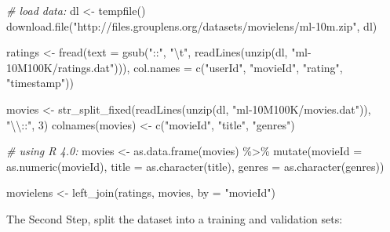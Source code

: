 \documentclass[
]{article}
\newenvironment{Shaded}{\begin{snugshade}}{\end{snugshade}}
\newcommand{\AttributeTok}[1]{\textcolor[rgb]{0.77,0.63,0.00}{#1}}
\newcommand{\CommentTok}[1]{\textcolor[rgb]{0.56,0.35,0.01}{\textit{#1}}}
\newcommand{\DecValTok}[1]{\textcolor[rgb]{0.00,0.00,0.81}{#1}}
\newcommand{\FunctionTok}[1]{\textcolor[rgb]{0.00,0.00,0.00}{#1}}
\newcommand{\NormalTok}[1]{#1}
\newcommand{\OtherTok}[1]{\textcolor[rgb]{0.56,0.35,0.01}{#1}}
\newcommand{\SpecialCharTok}[1]{\textcolor[rgb]{0.00,0.00,0.00}{#1}}
\newcommand{\StringTok}[1]{\textcolor[rgb]{0.31,0.60,0.02}{#1}}
\begin{document}
\begin{Shaded}
\begin{Highlighting}[]
\CommentTok{\#  load data:}
\NormalTok{dl }\OtherTok{\textless{}{-}} \FunctionTok{tempfile}\NormalTok{()}
\FunctionTok{download.file}\NormalTok{(}\StringTok{"http://files.grouplens.org/datasets/movielens/ml{-}10m.zip"}\NormalTok{, dl)}

\NormalTok{ratings }\OtherTok{\textless{}{-}} \FunctionTok{fread}\NormalTok{(}\AttributeTok{text =} \FunctionTok{gsub}\NormalTok{(}\StringTok{"::"}\NormalTok{, }\StringTok{"}\SpecialCharTok{\textbackslash{}t}\StringTok{"}\NormalTok{, }\FunctionTok{readLines}\NormalTok{(}\FunctionTok{unzip}\NormalTok{(dl, }\StringTok{"ml{-}10M100K/ratings.dat"}\NormalTok{))), }\AttributeTok{col.names =} \FunctionTok{c}\NormalTok{(}\StringTok{"userId"}\NormalTok{, }\StringTok{"movieId"}\NormalTok{, }\StringTok{"rating"}\NormalTok{, }\StringTok{"timestamp"}\NormalTok{))}

\NormalTok{movies }\OtherTok{\textless{}{-}} \FunctionTok{str\_split\_fixed}\NormalTok{(}\FunctionTok{readLines}\NormalTok{(}\FunctionTok{unzip}\NormalTok{(dl, }\StringTok{"ml{-}10M100K/movies.dat"}\NormalTok{)), }\StringTok{"}\SpecialCharTok{\textbackslash{}\textbackslash{}}\StringTok{::"}\NormalTok{, }\DecValTok{3}\NormalTok{)}
\FunctionTok{colnames}\NormalTok{(movies) }\OtherTok{\textless{}{-}} \FunctionTok{c}\NormalTok{(}\StringTok{"movieId"}\NormalTok{, }\StringTok{"title"}\NormalTok{, }\StringTok{"genres"}\NormalTok{)}

\CommentTok{\# using R 4.0:}
\NormalTok{movies }\OtherTok{\textless{}{-}} \FunctionTok{as.data.frame}\NormalTok{(movies) }\SpecialCharTok{\%\textgreater{}\%} \FunctionTok{mutate}\NormalTok{(}\AttributeTok{movieId =} \FunctionTok{as.numeric}\NormalTok{(movieId), }\AttributeTok{title =} \FunctionTok{as.character}\NormalTok{(title), }\AttributeTok{genres =} \FunctionTok{as.character}\NormalTok{(genres))}

\NormalTok{movielens }\OtherTok{\textless{}{-}} \FunctionTok{left\_join}\NormalTok{(ratings, movies, }\AttributeTok{by =} \StringTok{"movieId"}\NormalTok{)}
\end{Highlighting}
\end{Shaded}

The Second Step, split the dataset into a training and validation sets:
\end{document}
